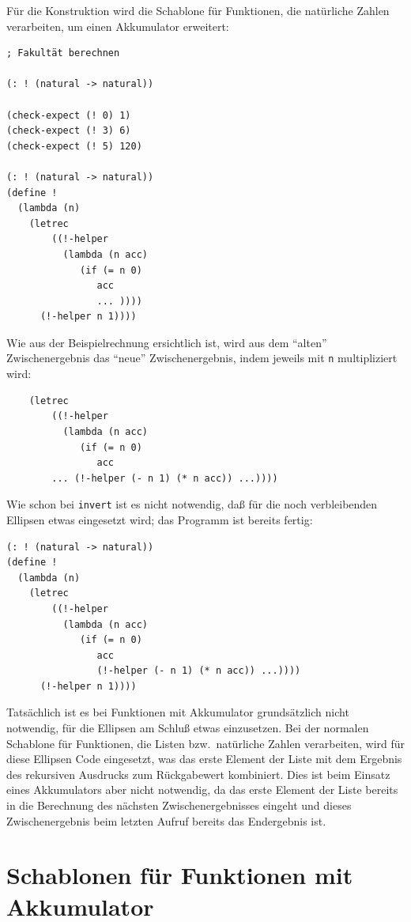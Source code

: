 Für die Konstruktion wird die Schablone für Funktionen, die natürliche
Zahlen verarbeiten, um einen Akkumulator erweitert:
\label{page:factorial-tail}
%
\begin{verbatim}
; Fakultät berechnen

(: ! (natural -> natural))

(check-expect (! 0) 1)
(check-expect (! 3) 6)
(check-expect (! 5) 120)

(: ! (natural -> natural))
(define !
  (lambda (n)
    (letrec
        ((!-helper
          (lambda (n acc)
             (if (= n 0)
                acc
                ... ))))
      (!-helper n 1))))
\end{verbatim}
%
Wie aus der Beispielrechnung ersichtlich ist, wird aus dem "`alten"'
Zwischenergebnis das "`neue"' Zwischenergebnis, indem jeweils
mit \texttt{n} multipliziert wird:
%
\begin{verbatim}
    (letrec
        ((!-helper
          (lambda (n acc)
             (if (= n 0)
                acc
        ... (!-helper (- n 1) (* n acc)) ...))))
\end{verbatim}
%
Wie schon bei \texttt{invert} ist es nicht notwendig, daß für die
noch verbleibenden Ellipsen etwas eingesetzt wird; das Programm ist
bereits fertig:
%
\begin{verbatim}
(: ! (natural -> natural))
(define !
  (lambda (n)
    (letrec
        ((!-helper
          (lambda (n acc)
             (if (= n 0)
                acc
                (!-helper (- n 1) (* n acc)) ...))))
      (!-helper n 1))))
\end{verbatim}
%
Tatsächlich ist es bei Funktionen mit Akkumulator grundsätzlich nicht
notwendig, für die Ellipsen am Schluß etwas einzusetzen. Bei der
normalen Schablone für Funktionen, die Listen bzw.\ natürliche Zahlen
verarbeiten, wird für diese Ellipsen Code eingesetzt, was das erste
Element der Liste mit dem Ergebnis des rekursiven Ausdrucks 
zum Rückgabewert kombiniert.  Dies ist beim Einsatz eines Akkumulators
aber nicht notwendig, da das erste Element der Liste bereits in die
Berechnung des nächsten Zwischenergebnisses eingeht und dieses
Zwischenergebnis beim letzten Aufruf bereits das Endergebnis ist.

\section{Schablonen für Funktionen mit Akkumulator}

